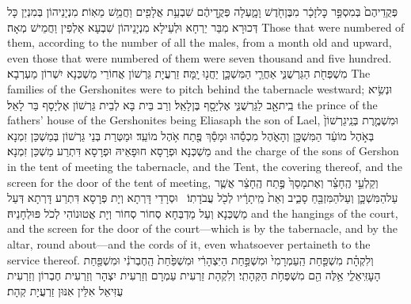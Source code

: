 {פְּקֻדֵיהֶם֙ בְּמִסְפַּ֣ר כׇּל\maqqaf זָכָ֔ר מִבֶּן\maqqaf חֹ֖דֶשׁ וָמָ֑עְלָה פְּקֻ֣דֵיהֶ֔ם שִׁבְעַ֥ת אֲלָפִ֖ים וַחֲמֵ֥שׁ מֵאֽוֹת׃}
{מִנְיָנֵיהוֹן בְּמִנְיַן כָּל דְּכוּרָא מִבַּר יַרְחָא וּלְעֵילָא מִנְיָנֵיהוֹן שִׁבְעָא אַלְפִין וַחֲמֵישׁ מְאָה׃}
{Those that were numbered of them, according to the number of all the males, from a month old and upward, even those that were numbered of them were seven thousand and five hundred.}{}
{מִשְׁפְּחֹ֖ת הַגֵּרְשֻׁנִּ֑י אַחֲרֵ֧י הַמִּשְׁכָּ֛ן יַחֲנ֖וּ יָֽמָּה׃}
{זַרְעֲיָת גֵּרְשׁוֹן אֲחוֹרֵי מַשְׁכְּנָא יִשְׁרוֹן מַעְרְבָא׃}
{The families of the Gershonites were to pitch behind the tabernacle westward;}{}
{וּנְשִׂ֥יא בֵֽית\maqqaf אָ֖ב לַגֵּרְשֻׁנִּ֑י אֶלְיָסָ֖ף בֶּן\maqqaf לָאֵֽל׃}
{וְרַב בֵּית בָּא לְבֵית גֵּרְשׁוֹן אֶלְיָסָף בַּר לָאֵל׃}
{the prince of the fathers’ house of the Gershonites being Eliasaph the son of Lael,}{}
{וּמִשְׁמֶ֤רֶת בְּנֵֽי\maqqaf גֵרְשׁוֹן֙ בְּאֹ֣הֶל מוֹעֵ֔ד הַמִּשְׁכָּ֖ן וְהָאֹ֑הֶל מִכְסֵ֕הוּ וּמָסַ֕ךְ פֶּ֖תַח אֹ֥הֶל מוֹעֵֽד׃}
{וּמַטְּרַת בְּנֵי גֵּרְשׁוֹן בְּמַשְׁכַּן זִמְנָא מַשְׁכְּנָא וּפְרָסָא חוּפָאֵיהּ וּפְרָסָא דִּתְרַע מַשְׁכַּן זִמְנָא׃}
{and the charge of the sons of Gershon in the tent of meeting the tabernacle, and the Tent, the covering thereof, and the screen for the door of the tent of meeting,}{}
{וְקַלְעֵ֣י הֶֽחָצֵ֗ר וְאֶת\maqqaf מָסַךְ֙ פֶּ֣תַח הֶֽחָצֵ֔ר אֲשֶׁ֧ר עַל\maqqaf הַמִּשְׁכָּ֛ן וְעַל\maqqaf הַמִּזְבֵּ֖חַ סָבִ֑יב וְאֵת֙ מֵֽיתָרָ֔יו לְכֹ֖ל עֲבֹדָתֽוֹ׃ \setuma }
{וּסְרָדֵי דָּרְתָא וְיָת פְּרָסָא דִּתְרַע דָּרְתָא דְּעַל מַשְׁכְּנָא וְעַל מַדְבְּחָא סְחוֹר סְחוֹר וְיָת אֲטוּנוֹהִי לְכֹל פּוּלְחָנֵיהּ׃}
{and the hangings of the court, and the screen for the door of the court—which is by the tabernacle, and by the altar, round about—and the cords of it, even whatsoever pertaineth to the service thereof.}{}
{וְלִקְהָ֗ת מִשְׁפַּ֤חַת הַֽעַמְרָמִי֙ וּמִשְׁפַּ֣חַת הַיִּצְהָרִ֔י וּמִשְׁפַּ֙חַת֙ הַֽחֶבְרֹנִ֔י וּמִשְׁפַּ֖חַת הָעׇזִּֽיאֵלִ֑י אֵ֥לֶּה הֵ֖ם מִשְׁפְּחֹ֥ת הַקְּהָתִֽי׃}
{וְלִקְהָת זַרְעִית עַמְרָם וְזַרְעִית יִצְהָר וְזַרְעִית חֶבְרוֹן וְזַרְעִית עֻזִּיאֵל אִלֵּין אִנּוּן זַרְעֲיָת קְהָת׃}
